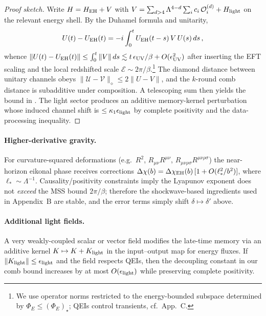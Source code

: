 \documentclass[a4paper,11pt]{article}
\newcommand{\Eflux}{\Phi_E}
\theoremstyle{plain}
\theoremstyle{definition}
\theoremstyle{remark}
\begin{document}
\begin{proof}[Proof sketch]
Write $H=H_{\rm EH}+V$ with $V=\sum_{d>4}\Lambda^{4-d}\sum_i c_i\,\mathcal{O}^{(d)}_i + H_{\rm light}$ on the relevant energy shell. By the Duhamel formula and unitarity,
\begin{equation}
U(t)-U_{\rm EH}(t)= -i\int_0^t U_{\rm EH}(t-s)\,V\,U(s)\,ds\,,
\end{equation}
whence $\|U(t)-U_{\rm EH}(t)\|\le \int_0^t \|V\|\,ds \lesssim t\,\epsilon_{\rm UV}/\beta + O(\epsilon_{\rm UV}^2)$ after inserting the EFT scaling and the local redshifted scale $\mathcal{E}\sim 2\pi/\beta$.\footnote{We use operator norms restricted to the energy-bounded subspace determined by $\Eflux\le (\Eflux)_\star$; QEIs control transients, cf.\ App.~C.} The diamond distance between unitary channels obeys $\|\mathcal{U}-\mathcal{V}\|_\diamond\le 2\|U-V\|$, and the $k$-round comb distance is subadditive under composition. A telescoping sum then yields the bound in . The light sector produces an additive memory-kernel perturbation whose induced channel shift is $\le \kappa_1\epsilon_{\rm light}$ by complete positivity and the data-processing inequality.
\end{proof}

\paragraph{Higher-derivative gravity.} For curvature-squared deformations (e.g.\ $R^2$, $R_{\mu\nu}R^{\mu\nu}$, $R_{\mu\nu\rho\sigma}R^{\mu\nu\rho\sigma}$) the near-horizon eikonal phase receives corrections $\Delta\chi(b)=\Delta\chi_{\rm EH}(b)\,[1+O(\ell_\ast^2/b^2)]$, where $\ell_\ast\sim \Lambda^{-1}$. Causality/positivity constraints imply the Lyapunov exponent does not \emph{exceed} the MSS bound $2\pi/\beta$; therefore the shockwave-based ingredients used in Appendix~B are stable, and the error terms simply shift $\delta\mapsto\delta'$ above.

\paragraph{Additional light fields.} A very weakly-coupled scalar or vector field modifies the late-time memory via an additive kernel $K\mapsto K+K_{\rm light}$ in the input--output map for energy fluxes. If $\|K_{\rm light}\|\le \epsilon_{\rm light}$ and the field respects QEIs, then the decoupling constant in our comb bound increases by at most $O(\epsilon_{\rm light})$ while preserving complete positivity.
\end{document}
